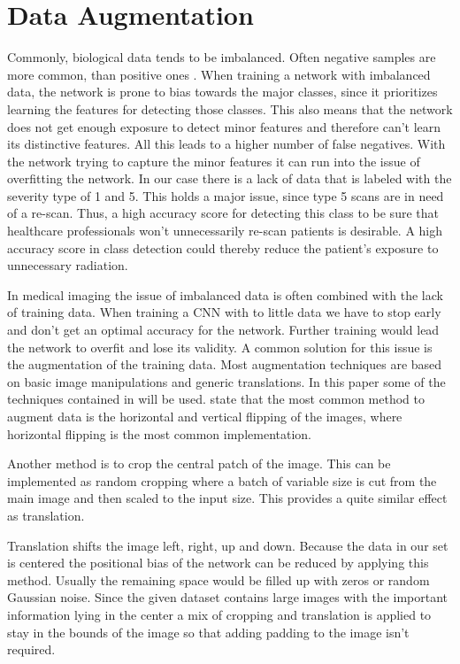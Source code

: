 \documentclass[
a4paper, 
12pt,
grayscalebody, %
abstract=on,
twoside, BCOR10mm, 12pt, DIV13,headinclude, footexclude, final, abstracton, openright
]{ibireprt}
\numberwithin{equation}{chapter}
\numberwithin{table}{chapter}
\numberwithin{figure}{chapter}
\numberwithin{algorithm}{chapter}
\numberwithin{example}{chapter}
\numberwithin{example}{chapter}
\begin{document}
\section{Data Augmentation}
Commonly, biological data tends to be imbalanced. Often negative samples are more common, than positive ones \citep{Alzubaidi2021}. When training a network with imbalanced data, the network is prone to bias towards the major classes, since it prioritizes learning the features for detecting those classes. This also means that the network does not get enough exposure to detect minor features and therefore can't learn its distinctive features. All this leads to a higher number of false negatives. With the network trying to capture the minor features it can run into the issue of overfitting the network. In our case there is a lack of data that is labeled with the severity type of 1 and 5. This holds a major issue, since type 5 scans are in need of a re-scan. Thus, a high accuracy score for detecting this class to be sure that healthcare professionals won't unnecessarily re-scan patients is desirable. A high accuracy score in class detection could thereby reduce the patient's exposure to unnecessary radiation.%


In medical imaging the issue of imbalanced data is often combined with the lack of training data. When training a CNN with to little data we have to stop early and don't get an optimal accuracy for the network. Further training would lead the network to overfit and lose its validity. A common solution for this issue is the augmentation of the training data. Most augmentation techniques are based on basic image manipulations and generic translations. In this paper some of the techniques contained in \citet{Shorten2019} will be used.\citet{Shorten2019} state that the most common method to augment data is the horizontal and vertical flipping of the images, where horizontal flipping is the most common implementation.

Another method is to crop the central patch of the image. This can be implemented as random cropping where a batch of variable size is cut from the main image and then scaled to the input size. This provides a quite similar effect as translation. 

Translation shifts the image left, right, up and down. Because the data in our set is centered the positional bias of the network can be reduced by applying this method. Usually the remaining space would be filled up with zeros or random Gaussian noise. Since the given dataset contains large images with the important information lying in the center a mix of cropping and translation is applied to stay in the bounds of the image so that adding padding to the image isn't required. 
\end{document}
